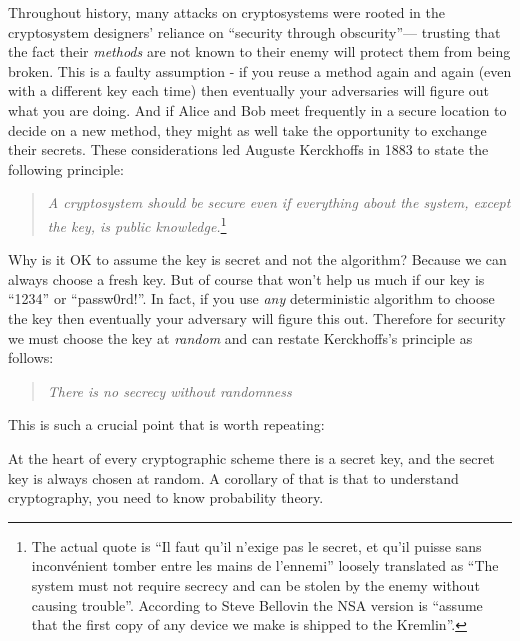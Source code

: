 Throughout history, many attacks on cryptosystems were rooted in the
cryptosystem designers' reliance on ``security through obscurity''---
trusting that the fact their \emph{methods} are not known to their enemy
will protect them from being broken. This is a faulty assumption - if
you reuse a method again and again (even with a different key each time)
then eventually your adversaries will figure out what you are doing. And
if Alice and Bob meet frequently in a secure location to decide on a new
method, they might as well take the opportunity to exchange their
secrets. These considerations led Auguste Kerckhoffs in 1883 to state
the following principle:

\begin{quote}
\emph{A cryptosystem should be secure even if everything about the
system, except the key, is public knowledge.}\footnote{The actual quote
  is ``Il faut qu'il n'exige pas le secret, et qu'il puisse sans
  inconvénient tomber entre les mains de l'ennemi'' loosely translated
  as ``The system must not require secrecy and can be stolen by the
  enemy without causing trouble''. According to Steve Bellovin the NSA
  version is ``assume that the first copy of any device we make is
  shipped to the Kremlin''.}
\end{quote}

Why is it OK to assume the key is secret and not the algorithm? Because
we can always choose a fresh key. But of course that won't help us much
if our key is ``1234'' or ``passw0rd!''. In fact, if you use \emph{any}
deterministic algorithm to choose the key then eventually your adversary
will figure this out. Therefore for security we must choose the key at
\emph{random} and can restate Kerckhoffs's principle as follows:

\begin{quote}
\emph{There is no secrecy without randomness}
\end{quote}

This is such a crucial point that is worth repeating:

\hypertarget{securityrandomness}{}

At the heart of every cryptographic scheme there is a secret key, and
the secret key is always chosen at random. A corollary of that is that
to understand cryptography, you need to know probability theory.

